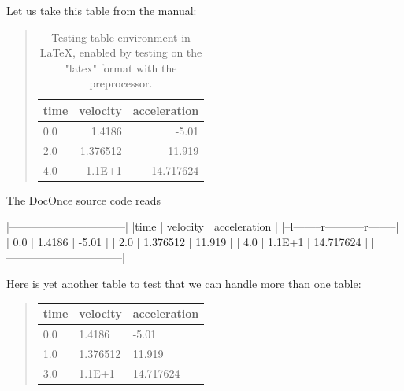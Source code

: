 \documentclass[%
oneside,                 %
final,                   %
10pt]{article}
\theoremstyle{definition}
\begin{document}
\begin{enumerate}


Let us take this table from the manual:

\begin{table}
\caption{
Testing table environment in {\LaTeX}, enabled by testing on the "latex" format
with the preprocessor.
\label{mytab}
}


\begin{quote}
\begin{tabular}{lrr}
\hline
\multicolumn{1}{c}{ time } & \multicolumn{1}{c}{ velocity } & \multicolumn{1}{c}{ acceleration } \\
\hline
0.0  & 1.4186   & -5.01        \\
2.0  & 1.376512 & 11.919       \\
4.0  & 1.1E+1   & 14.717624    \\
\hline
\end{tabular}
\end{quote}

\noindent
\end{table}

The DocOnce source code reads










\bccq

  |--------------------------------|
  |time  | velocity | acceleration |
  |--l--------r-----------r--------|
  | 0.0  | 1.4186   | -5.01        |
  | 2.0  | 1.376512 | 11.919       |
  | 4.0  | 1.1E+1   | 14.717624    |
  |--------------------------------|


\eccq


Here is yet another table to test that we can handle more than
one table:


\begin{quote}
\begin{tabular}{lll}
\hline
\multicolumn{1}{l}{ time } & \multicolumn{1}{l}{ velocity } & \multicolumn{1}{l}{ acceleration } \\
\hline
0.0  & 1.4186   & -5.01        \\
1.0  & 1.376512 & 11.919       \\
3.0  & 1.1E+1   & 14.717624    \\
\hline
\end{tabular}
\end{quote}


\end{enumerate}
\end{document}
